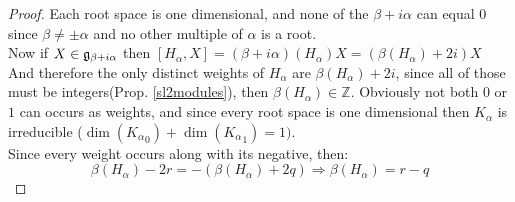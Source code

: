 \begin{proof}
	Each root space is one dimensional, and none of the $\beta+i\alpha$ can equal $0$ since $\beta \not= \pm \alpha$ and no other multiple of $\alpha$ is a root.\\
	Now if $X \in \mathfrak{g}_{\beta+i\alpha}$ then $[H_\alpha,X]=(\beta+i\alpha)(H_\alpha)X = (\beta(H_\alpha)+2i)X$
	And therefore the only distinct weights of $H_\alpha$ are $\beta(H_\alpha)+2i$, since all of those must be integers(Prop. \ref{sl2modules}), then $\beta(H_\alpha) \in \mathbb{Z}$. Obviously not both $0$ or $1$ can occurs as weights, and since every root space is one dimensional then $K_\alpha$ is irreducible ($\dim({K_\alpha}_0)+\dim({K_\alpha}_1)=1)$.\\
	Since every weight occurs along with its negative, then:\\
	$$\beta(H_\alpha)-2r=-(\beta(H_\alpha)+2q) \Rightarrow \beta(H_\alpha) = r-q$$
\end{proof}
